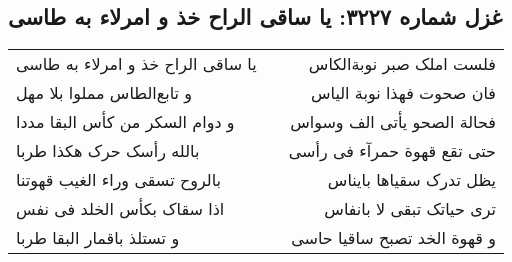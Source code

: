 \begin{center}
\section*{غزل شماره ۳۲۲۷: یا ساقی الراح خذ و امرلاء به طاسی}
\label{sec:3227}
\begin{longtable}{l p{0.5cm} r}
یا ساقی الراح خذ و امرلاء به طاسی
&&
فلست املک صبر نوبةالکاس
\\
و تابع‌الطاس مملوا بلا مهل
&&
فان صحوت فهذا نوبة الیاس
\\
و دوام السکر من کأس البقا مددا
&&
فحالة الصحو یأتی الف وسواس
\\
بالله رأسک حرک هکذا طربا
&&
حتی تقع قهوة حمرآء فی رأسی
\\
بالروح تسقی وراء الغیب قهوتنا
&&
یظل تدرک سقیاها بایناس
\\
اذا سقاک بکأس الخلد فی نفس
&&
تری حیاتک تبقی لا بانفاس
\\
و تستلذ باقمار البقا طربا
&&
و قهوة الخد تصبح ساقیا حاسی
\\
\end{longtable}
\end{center}

